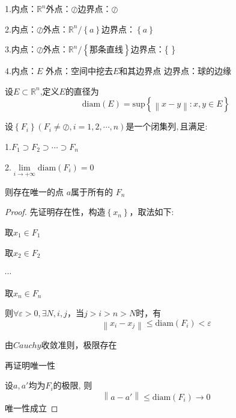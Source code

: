 \documentclass[lang=cn,10pt]{elegantbook}
\begin{document}
\begin{solution}
	
	1.内点：$\mathbb{R} ^n$外点：$\oslash$边界点：$\oslash$
	
	2.内点：$\oslash$外点：$\mathbb{R} ^n/\left\{ a \right\} $边界点：$\left\{ a \right\}$
	
	3.内点：$\oslash$外点：$\mathbb{R} ^n/\left\{ \text{那条直线} \right\} $边界点：\left\{  \right\}
	
	4.内点：$E$ 外点：空间中挖去$E$和其边界点 边界点：球的边缘
\end{solution}
\begin{definition}
	设$E\subset \mathbb{R} ^n$,定义$E$的直径为
	\begin{equation*}
		\mathrm{diam}\left( E \right) =\mathrm{sup}\left\{ \left\| x-y \right\| :x,y\in E \right\} 
	\end{equation*}
\end{definition}
\begin{theorem}
	$\text{设}\left\{ F_i \right\} \left( F_i\ne \oslash ,i=1,2,\cdots ,n \right) \text{是一个闭集列},\text{且满足}$:
	
	1.$F_1\supset F_2\supset \cdots \supset F_n$
	
	2.$\underset{i\rightarrow +\infty}{\lim}\mathrm{diam}\left( F_i \right) =0$
	
	则存在唯一的点 $a $属于所有的 $F_{n}$
\end{theorem}
\begin{proof}
	
	先证明存在性，构造$\left\{ x_n \right\} 
	$，取法如下:
	
	取$x_{1} \in F_{1}$
	
	取$x_{2} \in F_{2}$
	
	$\cdots$
	
	取$x_{n} \in F_{n}$
	
	则$\forall \varepsilon >0 ,\exists N,i,j$，当$j>i>n>N$时，有
	\begin{equation*}
		\left\| x_i-x_j \right\| \le \mathrm{diam}\left( F_i \right) <\varepsilon 
	\end{equation*}
	
	由$Cauchy$收敛准则，极限存在
	
	再证明唯一性
	
	设$a,a'$均为$F_{i}$的极限,
	则
	\begin{equation*}
		\left\| a-a' \right\| \le \mathrm{diam}\left( F_i \right) \rightarrow 0
	\end{equation*}
	唯一性成立
\end{proof}
\end{document}
